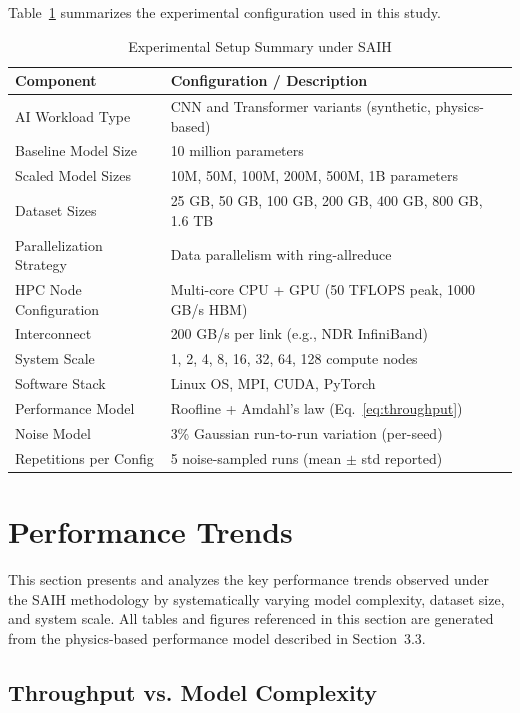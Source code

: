 \documentclass{llncs}
\begin{document}
Table~\ref{tab:setup} summarizes the experimental configuration used in this study.

\begin{table}[h]
\centering
\caption{Experimental Setup Summary under SAIH}
\label{tab:setup}
\begin{tabular*}{\columnwidth}{@{\extracolsep{\fill}} ll @{}}
\toprule
\textbf{Component} & \textbf{Configuration / Description} \\
\midrule
AI Workload Type & CNN and Transformer variants (synthetic, physics-based) \\
Baseline Model Size & 10 million parameters \\
Scaled Model Sizes & 10M, 50M, 100M, 200M, 500M, 1B parameters \\
Dataset Sizes & 25 GB, 50 GB, 100 GB, 200 GB, 400 GB, 800 GB, 1.6 TB \\
Parallelization Strategy & Data parallelism with ring-allreduce \\
HPC Node Configuration & Multi-core CPU + GPU (50 TFLOPS peak, 1000 GB/s HBM) \\
Interconnect & 200 GB/s per link (e.g., NDR InfiniBand) \\
System Scale & 1, 2, 4, 8, 16, 32, 64, 128 compute nodes \\
Software Stack & Linux OS, MPI, CUDA, PyTorch \\
Performance Model & Roofline + Amdahl's law (Eq.~\ref{eq:throughput}) \\
Noise Model & 3\% Gaussian run-to-run variation (per-seed) \\
Repetitions per Config & 5 noise-sampled runs (mean $\pm$ std reported) \\
\bottomrule
\end{tabular*}
\end{table}

\section{Performance Trends}

This section presents and analyzes the key performance trends observed under the SAIH methodology by systematically varying model complexity, dataset size, and system scale. All tables and figures referenced in this section are generated from the physics-based performance model described in Section~3.3.

\subsection{Throughput vs. Model Complexity}
\end{document}
